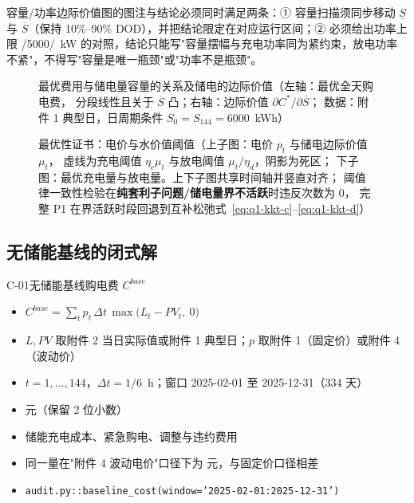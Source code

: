 \begin{guideblock}
容量/功率边际价值图的图注与结论必须同时满足两条：① 容量扫描须同步移动 \(\underline S\) 与 \(\overline S\)（保持 10\%--90\% DOD），并把结论限定在对应运行区间；② 必须给出功率上限 \ph/5000/\ph~kW 的对照，结论只能写"容量摆幅与充电功率同为紧约束，放电功率不紧"，不得写"容量是唯一瓶颈"或"功率不是瓶颈"。
\end{guideblock}

\begin{figure}[htbp]
  \centering
  \caption{最优费用与储电量容量的关系及储电的边际价值（左轴：最优全天购电费，
           分段线性且关于 \(\overline S\) 凸；右轴：边际价值 \(\partial C^*/\partial\overline S\)；
           数据：附件 1 典型日，日周期条件 \(S_0=S_{144}=6000\)~kWh）}
  \label{fig:watervalue}
\end{figure}

\begin{figure}[htbp]
  \centering
  \caption{最优性证书：电价与水价值阈值（上子图：电价 \(p_t\) 与储电边际价值 \(\mu_{t}\)，
           虚线为充电阈值 \(\eta_c\mu_{t}\) 与放电阈值 \(\mu_{t}/\eta_d\)，阴影为死区；
           下子图：最优充电量与放电量。上下子图共享时间轴并竖直对齐；
           阈值律一致性检验在\textbf{纯套利子问题/储电量界不活跃}时违反次数为 0，
           完整 P1 在界活跃时段回退到互补松弛式~\eqref{eq:q1-kkt-c}--\eqref{eq:q1-kkt-d}）}
  \label{fig:dualprice}
\end{figure}

\subsection{无储能基线的闭式解}

\begin{caliber}{C-01}{无储能基线购电费 \(C^{base}\)}
\begin{itemize}%
  \item[定义] \(C^{base}=\displaystyle\sum_{t}p_t\,\Delta t\,\max\bigl(L_t-PV_t,\ 0\bigr)\)%
  \item[数据] \(L,PV\) 取附件 2 当日实际值或附件 1 典型日；\(p\) 取附件 1（固定价）或附件 4（波动价）%
  \item[时段] \(t=1,\dots,144\)，\(\Delta t=1/6\)~h；窗口 2025-02-01 至 2025-12-31（334 天）%
  \item[单位] 元（保留 2 位小数）%
  \item[不含] 储能充电成本、紧急购电、调整与违约费用%
  \item[对照] 同一量在"附件 4 波动电价"口径下为 \ph{ }元，与固定价口径相差 \ph%
  \item[复算] \texttt{audit.py::baseline\_cost(window='2025-02-01:2025-12-31')}%
\end{itemize}
\end{caliber}

